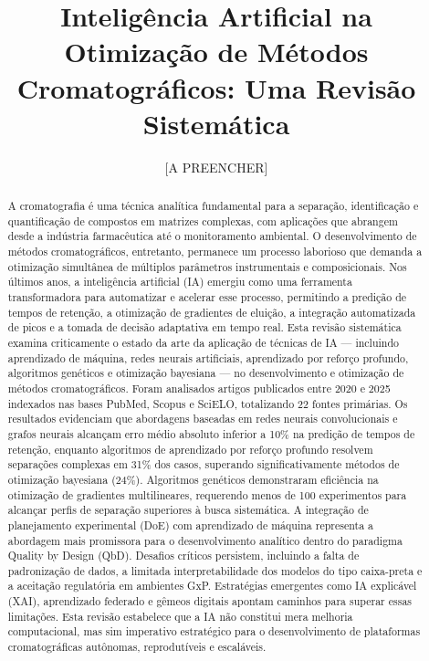 \documentclass[preprint,12pt]{elsarticle}
\begin{document}
\begin{frontmatter}

\title{Inteligência Artificial na Otimização de Métodos Cromatográficos: Uma Revisão Sistemática}

\author[A PREENCHER]{[A PREENCHER]}
\ead{[A PREENCHER]}

\affiliation[A PREENCHER]{
  [A PREENCHER]
}

\begin{abstract}
A cromatografia é uma técnica analítica fundamental para a separação, identificação e quantificação de compostos em matrizes complexas, com aplicações que abrangem desde a indústria farmacêutica até o monitoramento ambiental. O desenvolvimento de métodos cromatográficos, entretanto, permanece um processo laborioso que demanda a otimização simultânea de múltiplos parâmetros instrumentais e composicionais. Nos últimos anos, a inteligência artificial (IA) emergiu como uma ferramenta transformadora para automatizar e acelerar esse processo, permitindo a predição de tempos de retenção, a otimização de gradientes de eluição, a integração automatizada de picos e a tomada de decisão adaptativa em tempo real. Esta revisão sistemática examina criticamente o estado da arte da aplicação de técnicas de IA — incluindo aprendizado de máquina, redes neurais artificiais, aprendizado por reforço profundo, algoritmos genéticos e otimização bayesiana — no desenvolvimento e otimização de métodos cromatográficos. Foram analisados artigos publicados entre 2020 e 2025 indexados nas bases PubMed, Scopus e SciELO, totalizando 22 fontes primárias. Os resultados evidenciam que abordagens baseadas em redes neurais convolucionais e grafos neurais alcançam erro médio absoluto inferior a 10\% na predição de tempos de retenção, enquanto algoritmos de aprendizado por reforço profundo resolvem separações complexas em 31\% dos casos, superando significativamente métodos de otimização bayesiana (24\%). Algoritmos genéticos demonstraram eficiência na otimização de gradientes multilineares, requerendo menos de 100 experimentos para alcançar perfis de separação superiores à busca sistemática. A integração de planejamento experimental (DoE) com aprendizado de máquina representa a abordagem mais promissora para o desenvolvimento analítico dentro do paradigma Quality by Design (QbD). Desafios críticos persistem, incluindo a falta de padronização de dados, a limitada interpretabilidade dos modelos do tipo caixa-preta e a aceitação regulatória em ambientes GxP. Estratégias emergentes como IA explicável (XAI), aprendizado federado e gêmeos digitais apontam caminhos para superar essas limitações. Esta revisão estabelece que a IA não constitui mera melhoria computacional, mas sim imperativo estratégico para o desenvolvimento de plataformas cromatográficas autônomas, reprodutíveis e escaláveis.
\end{abstract}


\end{frontmatter}
\end{document}
